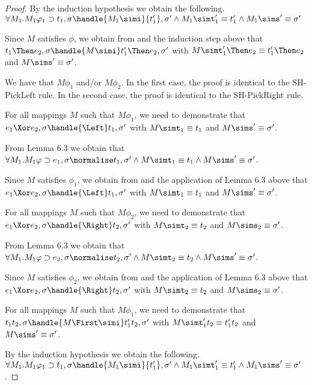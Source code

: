 \begin{proof}
{  By the induction hypothesis we obtain the following.
  $\forall M_1 . M_1 \phi_1 \implies t_1,\sigma \handle{M_1 \simi} {t_1'},{\sigma'}\land M_1 \simt_1'\equiv{t_1'}\land M_1\sims' \equiv {\sigma'}$

  Since $M$ satisfies $\phi$, we obtain from  and the induction step above that $t_1\Then e_2,\sigma\handle{M\simi}t_1'\Then e_2,\sigma'$ with
  $M \simt_1'\Then e_2\equiv {t_1'}\Then e_2$ and $M\sims'\equiv{\sigma'}$.
  }

    {
    We have that $M\phi_1$ and/or $M\phi_2$.
    In the first case, the proof is identical to the SH-PickLeft rule.
    In the second case, the proof is identical to the SH-PickRight rule.
    }

    {For all mappings $M$ such that  $M\phi_1$, we need to demonstrate that
    $e_1\Xor e_2,\sigma\handle{\Left}t_1,\sigma'$ with
    $M \simt_1\equiv {t_1}$ and $M\sims'\equiv {\sigma'}$.

    From Lemma 6.3 we obtain that $\forall M_1. M_1 \phi \implies e_1,\sigma{\normalise}{t_1},{\sigma'}\land M \simt_1\equiv{t_1}\land M \sims'\equiv{\sigma'}$.

    Since $M$ satisfies $\phi_1$, we obtain from  and the application of Lemma 6.3 above that $e_1\Xor e_2,\sigma\handle{\Left}t_1,\sigma'$ with
    $M \simt_1\equiv {t_1}$ and $M\sims'\equiv {\sigma'}$.
    }

    {For all mappings $M$ such that $M\phi_2$, we need to demonstrate that
    $e_1\Xor e_2,\sigma\handle{\Right}t_2,\sigma'$ with
    $M \simt_2\equiv {t_2}$ and $M\sims_2\equiv {\sigma'}$.

    From Lemma 6.3 we obtain that $\forall M_1. M_1 \phi \implies e_2,\sigma{\normalise}{t_2},{\sigma'}\land M \simt_2\equiv{t_2}\land M \sims'\equiv{\sigma'}$.

    Since $M$ satisfies $\phi_2$, we obtain from  and the application of Lemma 6.3 above that $e_1\Xor e_2,\sigma\handle{\Right}t_2,\sigma'$ with
    $M \simt_2\equiv {t_2}$ and $M\sims_2\equiv {\sigma'}$.
    }

  {For all mappings $M$ such that $M\phi_1$, we need to demonstrate that
   $t_1\And t_2,\sigma\handle{M\First \simi}t_1'\And t_2,\sigma'$ with
   $M \simt_1'\And t_2\equiv {t_1'}\And t_2$ and $M\sims'\equiv {\sigma'}$.

   By the induction hypothesis we obtain the following.
   $\forall M_1 . M_1 \phi_1 \implies t_1,\sigma \handle{M_1 \simi} {t_1'},{\sigma'}\land M_1 \simt_1'\equiv{t_1'}\land M_1\sims' \equiv {\sigma'}$.

}
\end{proof}
